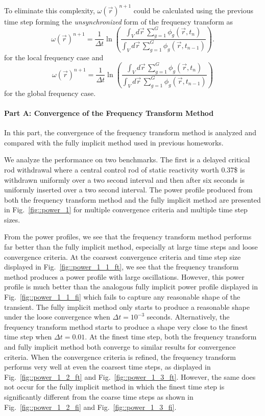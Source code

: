 \documentclass[12pt]{report}
\begin{document}
	To eliminate this complexity, $\omega(\vec{r})^{n+1}$ could be calculated using the previous time step forming the \textit{unsynchronized} form of the frequency transform as
	\begin{equation}
	\omega(\vec{r})^{n+1} = \frac{1}{\Delta t} \ln \left(\frac{\int_{V} d\vec{r} \, \sum_{g=1}^{G} \phi_g(\vec{r}, t_{n})}{\int_{V} d\vec{r} \,\sum_{g=1}^{G} \phi_g(\vec{r}, t_{n-1})} \right).
	\end{equation}
	for the local frequency case and
	\begin{equation}
	\omega(\vec{r})^{n+1} = \frac{1}{\Delta t} \ln \left(\frac{\int_{V} d\vec{r} \, \sum_{g=1}^{G} \phi_g(\vec{r}, t_{n})}{\int_{V} d\vec{r} \,\sum_{g=1}^{G} \phi_g(\vec{r}, t_{n-1})} \right)
	\end{equation}	
	for the global frequency case.
	
	\paragraph{Part A: Convergence of the Frequency Transform Method}
	In this part, the convergence of the frequency transform method is analyzed and compared with the fully implicit method used in previous homeworks.
	
	We analyze the performance on two benchmarks. The first is a delayed critical rod withdrawal where a central control rod of static reactivity worth 0.37\$ is withdrawn uniformly over a two second interval and then after six seconds is uniformly inserted over a two second interval. The power profile produced from both the frequency transform method and the fully implicit method are presented in Fig.~\ref{fig::power_1} for multiple convergence criteria and multiple time step sizes.
	
	From the power profiles, we see that the frequency transform method performs far better than the fully implicit method, especially at large time steps and loose convergence criteria. At the coarsest convergence criteria and time step size displayed in Fig.~\ref{fig::power_1_1_ft}, we see that the frequency transform method produces a power profile with large oscillations. However, this power profile is much better than the analogous fully implicit power profile displayed in Fig.~\ref{fig::power_1_1_fi} which fails to capture any reasonable shape of the transient. The fully implicit method only starts to produce a reasonable shape under the loose convergence when $\Delta t = 10^{-3}$ seconds. Alternatively, the frequency transform method starts to produce a shape very close to the finest time step when $\Delta t = 0.01$. At the finest time step, both the frequency transform and fully implicit method both converge to similar results for convergence criteria. When the convergence criteria is refined, the frequency transform performs very well at even the coarsest time steps, as displayed in Fig.~\ref{fig::power_1_2_ft} and Fig.~\ref{fig::power_1_3_ft}. However, the same does not occur for the fully implicit method in which the finest time step is significantly different from the coarse time steps as shown in Fig.~\ref{fig::power_1_2_fi} and Fig.~\ref{fig::power_1_3_fi}.
	
\end{document}

